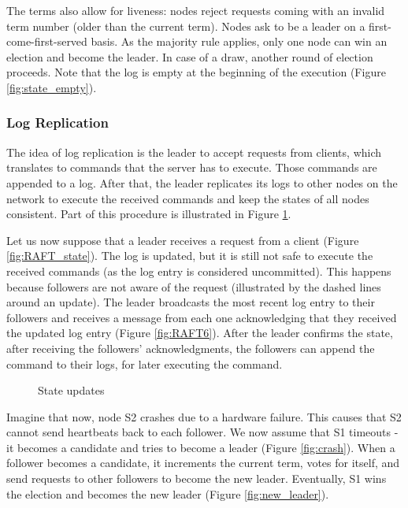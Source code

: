 \documentclass[12pt,a4paper]{article}
\begin{document}
The terms also allow for liveness: nodes reject requests coming with an invalid term number (older than the current term). Nodes ask to be a leader on a  first-come-first-served basis. As the majority rule applies, only one node can win an election and become the leader. In case of a draw, another round of election proceeds. Note that the log is empty at the beginning of the execution (Figure \ref{fig:state_empty}).





\subsubsection{Log Replication}
The idea of log replication is the leader to accept requests from clients, which translates to commands that the server has to execute. Those commands are appended to a log. After that, the leader replicates its logs to other nodes on the network to execute the received commands and keep the states of all nodes consistent. Part of this procedure is illustrated in Figure \ref{fig:su_2}. 

Let us now suppose that a leader receives a request from a client (Figure \ref{fig:RAFT_state}). The log is updated, but it is still not safe to execute the received commands (as the log entry is considered uncommitted). This happens because followers are not aware of the request (illustrated by the dashed lines around an update). The leader broadcasts the most recent log entry to their followers and receives a message from each one acknowledging that they received the updated log entry (Figure \ref{fig:RAFT6}). After the leader confirms the state, after receiving the followers' acknowledgments, the followers can append the command to their logs, for later executing the command. 


\begin{figure}[h!]
    \centering
    \qquad
    \caption{State updates}%
    \label{fig:su_2}%
\end{figure}

Imagine that now, node S2 crashes due to a hardware failure. This causes that S2 cannot send heartbeats back to each follower. We now assume that S1 timeouts - it becomes a candidate and tries to become a leader (Figure \ref{fig:crash}). When a follower becomes a candidate, it increments the current term, votes for itself, and send requests to other followers to become the new leader. Eventually, S1 wins the election and becomes the new leader (Figure \ref{fig:new_leader}).
\end{document}
